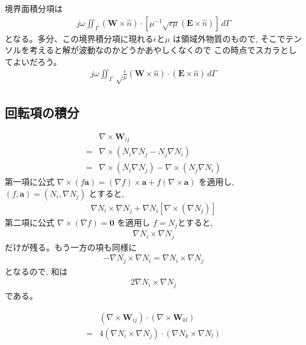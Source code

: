 境界面積分項は
\begin{align}
j\omega\iint_\Gamma
\left(\bm{W}\times\hat{n}\right)\cdot
\left[\mu^{-1}
\sqrt{\epsilon\mu}\left(\bm{E}\times\hat{n}\right)
\right]\,d\Gamma
\end{align}
となる。多分、この境界積分項に現れる$\epsilon$と$\mu$
は領域外物質のもので,
そこでテンソルを考えると解が波動なのかどうかあやしくなくので%
この時点でスカラとしてよいだろう。
\begin{align}
j\omega\iint_\Gamma\sqrt\frac{\epsilon}{\mu}
\left(\bm{W}\times\hat{n}\right)\cdot
\left(\bm{E}\times\hat{n}\right)
\,d\Gamma
\end{align}

\subsection{回転項の積分}

\begin{align}
&\nabla\times\bm{W}_{ij}\\
=&\nabla\times\left(N_i\nabla N_j-N_j\nabla N_i\right)\\
=&\nabla\times\left(N_i\nabla N_j\right)
 -\nabla\times\left(N_j\nabla N_i\right)
\end{align}
第一項に公式
$\nabla\times\left(f\bm{a}\right)
=\left(\nabla f\right)\times\bm{a}
+f\left(\nabla\times\bm{a}\right)$
を適用し,
$\left(f, \bm{a}\right)
=\left(N_i, \nabla N_j\right)$
とすると,
\begin{align}
\nabla N_i\times\nabla N_j
+\nabla N_i\left[\nabla\times\left(\nabla N_j\right)\right]
\end{align}
第二項に公式
$\nabla\times\left(\nabla f\right)=\bm{0}$
を適用し
$f=N_j$とすると,
\begin{align}
\nabla N_i\times\nabla N_j
\end{align}
だけが残る。もう一方の項も同様に
\begin{align}
-\nabla N_j\times\nabla N_i = \nabla N_i\times\nabla N_j
\end{align}
となるので, 和は
\begin{align}
2\nabla N_i\times\nabla N_j
\end{align}
である。

\begin{align}
&\left(\nabla\times\bm{W}_{ij}\right)\cdot
\left(\nabla\times\bm{W}_{kl}\right)\\
=&4\left(\nabla N_i\times\nabla N_j\right)\cdot
   \left(\nabla N_k\times\nabla N_l\right)
\end{align}

